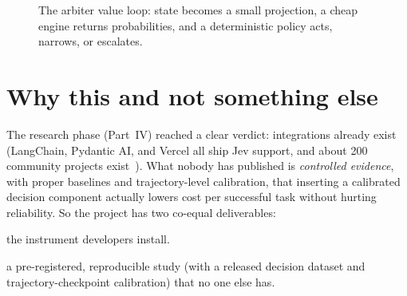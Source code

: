 \begin{figure}[t]\centering
{}
\caption{The arbiter value loop: state becomes a small projection, a cheap engine
returns probabilities, and a deterministic policy acts, narrows, or escalates.}
\label{fig:value}
\end{figure}

\section{Why this and not something else}

The research phase (Part~IV) reached a clear verdict: integrations already exist
(LangChain, Pydantic AI, and Vercel all ship Jev support, and about 200 community projects
exist~\citep{langchain_typesafe,pydantic_typesafe}). What nobody has published is
\emph{controlled evidence}, with proper baselines and trajectory-level calibration, that
inserting a calibrated decision component actually lowers cost per successful task without
hurting reliability. So the project has two co-equal deliverables:

\begin{description}[leftmargin=1.4cm,style=nextline]
  \item[Deliverable A --- the SDK] the instrument developers install.
  \item[Deliverable B --- the evidence] a pre-registered, reproducible study (with a
    released decision dataset and trajectory-checkpoint calibration) that no one else has.
\end{description}

